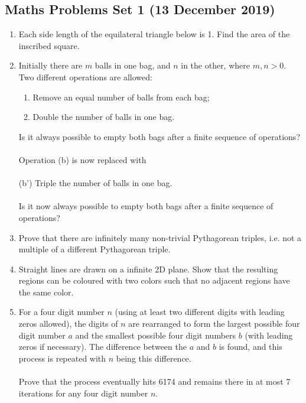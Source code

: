 \documentclass[a4paper]{article}
\begin{document}
\begin{center}
    \section*{Maths Problems Set 1 (13 December 2019)}
\end{center}

\begin{enumerate}
    \item
    Each side length of the equilateral triangle below is 1. Find the area of the inscribed square.\\
    
    \item
    Initially there are $m$ balls in one bag, and $n$ in the other, where $m, n > 0$. Two different operations are allowed:
    \begin{enumerate}
        \item Remove an equal number of balls from each bag;
        \item Double the number of balls in one bag.
    \end{enumerate}
    Is it always possible to empty both bags after a finite sequence of operations?\\\\
    Operation (b) is now replaced with\\\\
    (b') Triple the number of balls in one bag.\\\\
    Is it now always possible to empty both bags after a finite sequence of operations?
    
    \item
    Prove that there are infinitely many non-trivial Pythagorean triples, i.e. not a multiple of a different Pythagorean triple.
    
    \item
    Straight lines are drawn on a infinite 2D plane. Show that the resulting regions can be coloured with two colors such that no adjacent regions have the same color.
    
    \item
    For a four digit number $n$ (using at least two different digits with leading zeros allowed), the digits of $n$ are rearranged to form the largest possible four digit number $a$ and the smallest possible four digit numbers $b$ (with leading zeros if necessary). The difference between the $a$ and $b$ is found, and this process is repeated with $n$ being this difference.\\
    \\
    Prove that the process eventually hits 6174 and remains there in at most 7 iterations for any four digit number $n$.
    

\end{enumerate}
\end{document}
